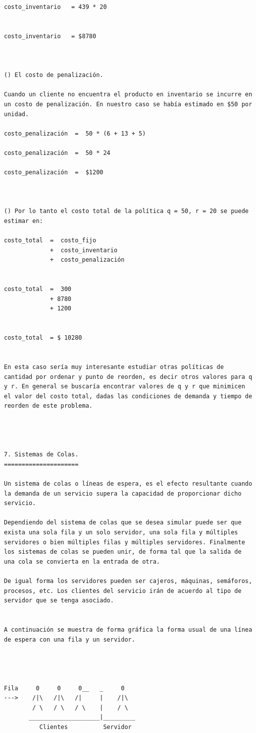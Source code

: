 \begin{verbatim}
costo_inventario   = 439 * 20  


costo_inventario   = $8780



() El costo de penalización.

Cuando un cliente no encuentra el producto en inventario se incurre en un costo de penalización. En nuestro caso se había estimado en $50 por unidad.

costo_penalización  =  50 * (6 + 13 + 5)  

costo_penalización  =  50 * 24

costo_penalización  =  $1200



() Por lo tanto el costo total de la política q = 50, r = 20 se puede estimar en:

costo_total  =  costo_fijo 
             +  costo_inventario 
             +  costo_penalización


costo_total  =  300  
             + 8780 
             + 1200


costo_total  = $ 10280


En esta caso sería muy interesante estudiar otras políticas de cantidad por ordenar y punto de reorden, es decir otros valores para q y r. En general se buscaría encontrar valores de q y r que minimicen el valor del costo total, dadas las condiciones de demanda y tiempo de reorden de este problema.




7. Sistemas de Colas.
=====================

Un sistema de colas o líneas de espera, es el efecto resultante cuando la demanda de un servicio supera la capacidad de proporcionar dicho servicio.

Dependiendo del sistema de colas que se desea simular puede ser que exista una sola fila y un solo servidor, una sola fila y múltiples servidores o bien múltiples filas y múltiples servidores. Finalmente los sistemas de colas se pueden unir, de forma tal que la salida de una cola se convierta en la entrada de otra.

De igual forma los servidores pueden ser cajeros, máquinas, semáforos, procesos, etc. Los clientes del servicio irán de acuerdo al tipo de servidor que se tenga asociado.


A continuación se muestra de forma gráfica la forma usual de una línea de espera con una fila y un servidor.




Fila     0     0     0__   _     0
--->    /|\   /|\   /|     |    /|\
        / \   / \   / \    |    / \
       ____________________|_________
          Clientes          Servidor




\end{verbatim}
